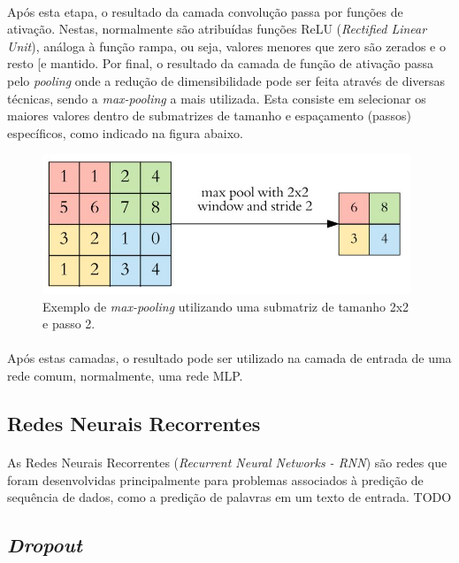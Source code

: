 \documentclass[grad,numbers]{coppe}
\begin{document}
  		\paragraph{}Após esta etapa, o resultado da camada convolução passa por funções de ativação. Nestas, normalmente são atribuídas funções ReLU (\textit{Rectified Linear Unit}), análoga à função rampa, ou seja, valores menores que zero são zerados e o resto [e mantido. Por final, o resultado da camada de função de ativação passa pelo \textit{pooling} onde a redução de dimensibilidade pode ser feita através de diversas técnicas, sendo a \textit{max-pooling} a mais utilizada. Esta consiste em selecionar os maiores valores dentro de submatrizes de tamanho e espaçamento (passos) específicos, como indicado na figura abaixo.
  		\begin{figure}[h]
  			\centering
  			\includegraphics[width=11cm]{pooling.jpg}
  			\caption{Exemplo de \textit{max-pooling} utilizando uma submatriz de tamanho 2x2 e passo 2\cite{kernel-example}.}
  			\label{fig:pooling-fig}
  		\end{figure}
  		\paragraph{}Após estas camadas, o resultado pode ser utilizado na camada de entrada de uma rede comum, normalmente, uma rede MLP.
	  \subsection{Redes Neurais Recorrentes}
	  	\paragraph{}As Redes Neurais Recorrentes (\textit{Recurrent Neural Networks - RNN}) são redes que foram desenvolvidas principalmente para problemas associados à predição de sequência de dados, como a predição de palavras em um texto de entrada. TODO
  	\subsection{\textit{Dropout}}
\end{document}
